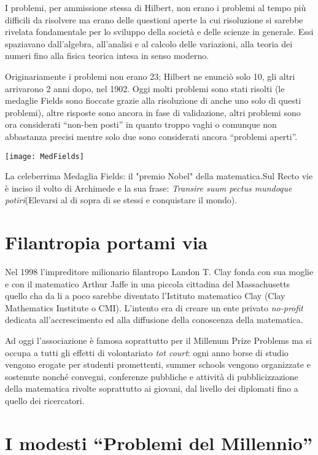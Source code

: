 I problemi, per ammissione stessa di Hilbert, non erano i problemi al tempo più difficili da risolvere ma erano delle questioni aperte la cui risoluzione si sarebbe rivelata fondamentale per lo sviluppo della società e delle scienze in generale. Essi spaziavano dall’algebra, all’analisi e al calcolo delle variazioni, alla teoria dei numeri fino alla fisica teorica intesa in senso moderno.

Originariamente i problemi non erano 23; Hilbert ne enunciò solo 10, gli altri arrivarono 2 anni dopo, nel 1902. Oggi molti problemi sono stati risolti (le medaglie Fields sono fioccate grazie alla risoluzione di anche uno solo di questi problemi), altre risposte sono ancora in fase di validazione, altri problemi sono ora considerati “non-ben posti” in quanto troppo vaghi o comunque non abbastanza precisi mentre solo due sono considerati ancora “problemi aperti”.
\begin{marginfigure}%
	\texttt{[image: MedFields]}
	\caption{La celeberrima Medaglia Fields: il "premio Nobel" della matematica.Sul Recto vie è inciso il volto di Archimede e la sua frase: \emph{Transire suum pectus mundoque potiri}(Elevarsi al di sopra di se stessi e conquistare il mondo).}
	\label{fig:fields}
\end{marginfigure}
\section{Filantropia portami via}

Nel 1998 l’impreditore milionario filantropo Landon T. Clay fonda con sua moglie e con il matematico Arthur Jaffe in una piccola cittadina del Massachusetts quello cha da li a poco sarebbe diventato l’Istituto matematico Clay (Clay Mathematics Institute o CMI). L’intento era di creare un ente privato \emph{no-profit} dedicata all'accrescimento ed alla diffusione della conoscenza della matematica.

Ad oggi l’associazione è famosa soprattutto per il Millenum Prize Problems ma si occupa a tutti gli effetti di volontariato \emph{tot court}: ogni anno borse di studio vengono erogate per studenti promettenti, summer schools vengono organizzate e sostenute nonché convegni, conferenze pubbliche e attività di pubblicizzazione della matematica rivolte soprattutto ai giovani, dal livello dei diplomati fino a quello dei ricercatori.

\section{I modesti “Problemi del Millennio”}

